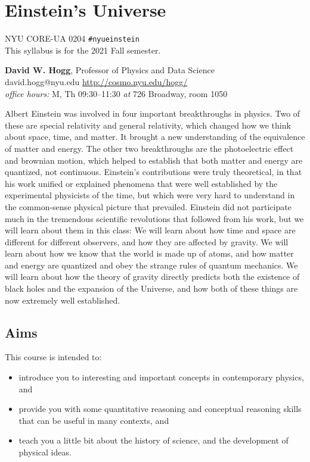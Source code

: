 \documentclass[12pt, letterpaper]{article}
\begin{document}
\sloppy\sloppypar\raggedbottom\frenchspacing

\section*{Einstein's Universe}
NYU CORE-UA 0204 \hfill \texttt{\#nyueinstein}\\
This syllabus is for the 2021 Fall semester.

\bigskip
\noindent
\textbf{David W. Hogg}, Professor of Physics and Data Science \\
david.hogg@nyu.edu \hfill \url{http://cosmo.nyu.edu/hogg/} \\
\textsl{office hours:} M, Th 09:30--11:30 \textsl{at} 726 Broadway, room 1050

\bigskip
\noindent
Albert Einstein was involved in four important breakthroughs in
physics.
Two of these are special relativity and general relativity, which
changed how we think about space, time, and matter. It brought a new
understanding of the equivalence of matter and energy.
The other two breakthroughs are the photoelectric effect and brownian
motion, which helped to establish that both matter and energy are quantized,
not continuous.
Einstein's contributions were truly theoretical, in that his work
unified or explained phenomena that were well established by the
experimental physicists of the time, but which were very hard to
understand in the common-sense physical picture that prevailed.
Einstein did not participate much in the tremendous scientific
revolutions that followed from his work, but we will learn about
them in this class:
We will learn about how time and space are different for different
observers, and how they are affected by gravity.
We will learn about how we know that the world is made up of atoms,
and how matter and energy are quantized and obey the strange rules of
quantum mechanics.
We will learn about how the theory of gravity directly predicts both
the existence of black holes and the expansion of the Universe, and
how both of these things are now extremely well established.

\subsection*{Aims}

This course is intended to:
\begin{itemize}
\item
introduce you to interesting and important concepts in contemporary
physics, and
\item
provide you with some quantitative reasoning and conceptual
reasoning skills that can be useful in many contexts, and
\item
teach you a little bit about the history of science,
and the development of physical ideas.
\end{itemize}
\end{document}
